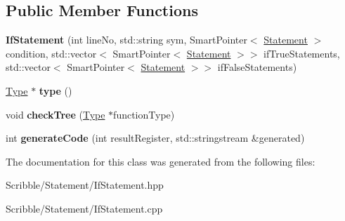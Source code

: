 \subsection*{Public Member Functions}
\begin{DoxyCompactItemize}
\item 
\hypertarget{class_if_statement_ae28f361bd20a8349bfa67e3106068cdd}{{\bfseries If\-Statement} (int line\-No, std\-::string sym, Smart\-Pointer$<$ \hyperlink{class_statement}{Statement} $>$ condition, std\-::vector$<$ Smart\-Pointer$<$ \hyperlink{class_statement}{Statement} $>$$>$ if\-True\-Statements, std\-::vector$<$ Smart\-Pointer$<$ \hyperlink{class_statement}{Statement} $>$$>$ if\-False\-Statements)}\label{class_if_statement_ae28f361bd20a8349bfa67e3106068cdd}

\item 
\hypertarget{class_if_statement_afaf7d301ab6125b9f2590b3f42f1c4ac}{\hyperlink{class_type}{Type} $\ast$ {\bfseries type} ()}\label{class_if_statement_afaf7d301ab6125b9f2590b3f42f1c4ac}

\item 
\hypertarget{class_if_statement_a1b556b2b38bc32cf7b35735a1b6e6f30}{void {\bfseries check\-Tree} (\hyperlink{class_type}{Type} $\ast$function\-Type)}\label{class_if_statement_a1b556b2b38bc32cf7b35735a1b6e6f30}

\item 
\hypertarget{class_if_statement_a1d4320274392918350a2c22d4e7679f5}{int {\bfseries generate\-Code} (int result\-Register, std\-::stringstream \&generated)}\label{class_if_statement_a1d4320274392918350a2c22d4e7679f5}

\end{DoxyCompactItemize}


The documentation for this class was generated from the following files\-:\begin{DoxyCompactItemize}
\item 
Scribble/\-Statement/If\-Statement.\-hpp\item 
Scribble/\-Statement/If\-Statement.\-cpp\end{DoxyCompactItemize}
